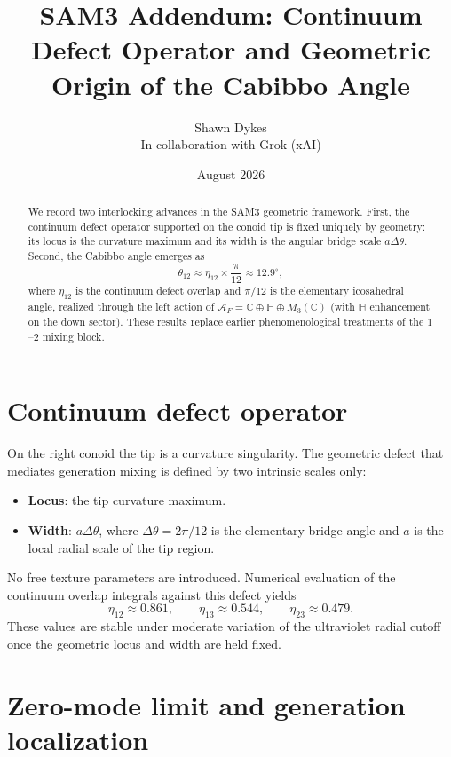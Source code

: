 \documentclass[11pt,a4paper]{article}
\title{SAM3 Addendum: Continuum Defect Operator and Geometric Origin of the Cabibbo Angle}
\author{Shawn Dykes\\[0.5em]
\small In collaboration with Grok (xAI)}
\date{August 2026}
\begin{document}
\maketitle

\begin{abstract}
We record two interlocking advances in the SAM3 geometric framework. First, the continuum defect operator supported on the conoid tip is fixed uniquely by geometry: its locus is the curvature maximum and its width is the angular bridge scale $a\Delta\theta$. Second, the Cabibbo angle emerges as
\[
\theta_{12}\approx\eta_{12}\times\frac{\pi}{12}\approx 12.9^\circ,
\]
where $\eta_{12}$ is the continuum defect overlap and $\pi/12$ is the elementary icosahedral angle, realized through the left action of $\mathcal{A}_F=\mathbb{C}\oplus\mathbb{H}\oplus M_3(\mathbb{C})$ (with $\mathbb{H}$ enhancement on the down sector). These results replace earlier phenomenological treatments of the $1$--$2$ mixing block.
\end{abstract}

\section{Continuum defect operator}

On the right conoid the tip is a curvature singularity. The geometric defect that mediates generation mixing is defined by two intrinsic scales only:
\begin{itemize}
\item \textbf{Locus}: the tip curvature maximum.
\item \textbf{Width}: $a\Delta\theta$, where $\Delta\theta=2\pi/12$ is the elementary bridge angle and $a$ is the local radial scale of the tip region.
\end{itemize}
No free texture parameters are introduced. Numerical evaluation of the continuum overlap integrals against this defect yields
\begin{equation}
\eta_{12}\approx 0.861,\qquad
\eta_{13}\approx 0.544,\qquad
\eta_{23}\approx 0.479.
\end{equation}
These values are stable under moderate variation of the ultraviolet radial cutoff once the geometric locus and width are held fixed.

\section{Zero-mode limit and generation localization}
\end{document}
